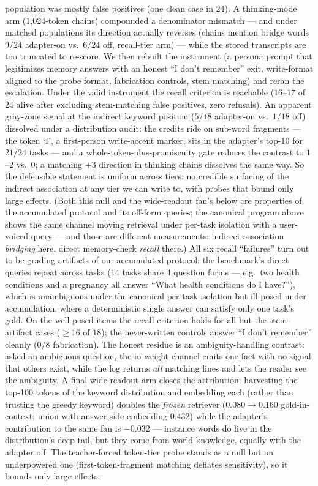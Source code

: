 \documentclass[11pt]{article}
\begin{document}
population was mostly false positives (one clean case in $24$). A thinking-mode arm
(1{,}024-token chains) compounded a denominator mismatch --- and under matched populations its
direction actually reverses (chains mention bridge words $9/24$ adapter-on vs.\ $6/24$ off,
recall-tier arm) --- while the stored transcripts are too truncated to re-score. We then rebuilt
the instrument (a persona prompt that legitimizes memory answers with an honest ``I don't
remember'' exit, write-format aligned to the probe format, fabrication controls, stem matching)
and reran the escalation. Under the valid instrument the recall criterion is reachable
($16$--$17$ of $24$ alive after excluding stem-matching false positives, zero refusals). An
apparent gray-zone signal at the indirect keyword position ($5/18$ adapter-on vs.\ $1/18$
off) dissolved under a distribution audit: the credits ride on sub-word fragments --- the
token `I', a first-person write-accent marker, sits in the adapter's top-10 for $21/24$
tasks --- and a whole-token-plus-promiscuity gate reduces the contrast to $1$--$2$ vs.\ $0$;
a matching $+3$ direction in thinking chains dissolves the same way. So the defensible
statement is uniform across tiers: no credible surfacing of the indirect association at any
tier we can write to, with probes that bound only large effects. (Both this null and the
wide-readout fan's below are properties of the accumulated protocol and its off-form queries; the canonical
program above shows the same channel moving retrieval under per-task isolation with a
user-voiced query --- and those are different measurements: indirect-association
\emph{bridging} here, direct memory-check \emph{recall} there.) All six recall
``failures'' turn out to be grading artifacts of our accumulated protocol: the benchmark's
direct queries repeat across tasks ($14$ tasks share $4$ question forms --- e.g.\ two health
conditions and a pregnancy all answer ``What health conditions do I have?''), which is
unambiguous under the canonical per-task isolation but ill-posed under accumulation, where a
deterministic single answer can satisfy only one task's gold. On the well-posed items the
recall criterion holds for all but the stem-artifact cases ($\ge 16$ of $18$); the never-written controls answer ``I don't remember''
cleanly ($0/8$ fabrication). The honest residue is an ambiguity-handling contrast: asked an
ambiguous question, the in-weight channel emits one fact with no signal that others exist,
while the log returns \emph{all} matching lines and lets the reader see the ambiguity. A final wide-readout arm closes the attribution: harvesting the
top-100 tokens of the keyword distribution and embedding each (rather than trusting the
greedy keyword) doubles the \emph{frozen} retriever ($0.080 \to 0.160$ gold-in-context; union
with answer-side embedding $0.432$) while the adapter's contribution to the same fan is
$-0.032$ --- instance words do live in the distribution's deep tail, but they come from world
knowledge, equally with the adapter off. The teacher-forced token-tier probe stands as a null
but an underpowered one (first-token-fragment matching deflates sensitivity), so it bounds
only large effects.
\end{document}
